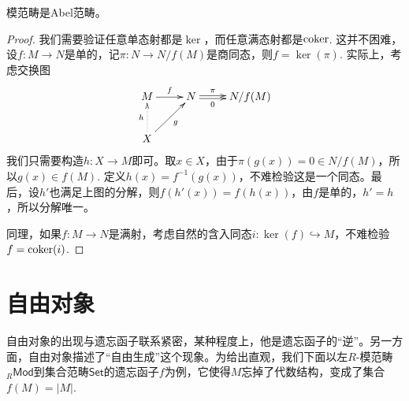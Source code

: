 \begin{thm}
模范畴是Abel范畴。
\end{thm}

\begin{proof}
我们需要验证任意单态射都是$\ker$，而任意满态射都是$\operatorname{coker}$. 这并不困难，设$f:M\to N$是单的，记$\pi:N\to N/f(M)$是商同态，则$f=\ker(\pi)$. 实际上，考虑交换图
\[
\begin{xy}
	\xymatrix{
		M\ar[r]^-{f}&N\ar@<0.3ex>[r]^-{\pi} \ar@<-0.3ex>[r]_-{0}&N/f(M)\\
		X\ar@{.>}[u]^-{h}\ar[ur]_-{g}
	}
\end{xy}
\]
我们只需要构造$h:X\to M$即可。取$x\in X$，由于$\pi (g(x))=0\in N/f(M)$，所以$g(x)\in f(M)$. 定义$h(x)=f^{-1}(g(x))$，不难检验这是一个同态。最后，设$h'$也满足上图的分解，则$f(h'(x))=f(h(x))$，由$f$是单的，$h'=h$，所以分解唯一。

同理，如果$f:M\to N$是满射，考虑自然的含入同态$i:\ker(f)\hookrightarrow M$，不难检验$f=\operatorname{coker}(i)$.
\end{proof}

\section{自由对象}




自由对象的出现与遗忘函子联系紧密，某种程度上，他是遗忘函子的“逆”。另一方面，自由对象描述了“自由生成”这个现象。为给出直观，我们下面以左$R$-模范畴${}_R\mathsf{Mod}$到集合范畴$\mathsf{Set}$的遗忘函子$f$为例，它使得$M$忘掉了代数结构，变成了集合$f(M)=|M|$. 

